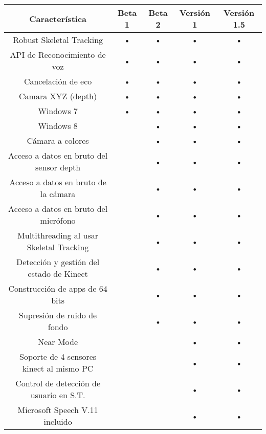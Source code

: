 \documentclass[11pt,a4paper]{article}
\begin{document}
\begin{tabular}{||c||c||c||c||c||}
\rowcolor{LightBlue2}

\hline  Característica                           & Beta 1 & Beta 2 & Versión 1 & Versión 1.5 \\ 
\hline Robust Skeletal Tracking                 & •      & •      & •         & •           \\ 
\hline API de Reconocimiento de voz             & •      & •      & •         & •           \\ 
\hline Cancelación de eco                       & •      & •      & •         & •           \\ 
\hline Camara XYZ (depth)                       & •      & •      & •         & •           \\ 
\hline Windows 7                                & •      & •      & •         & •           \\ 
\hline Windows 8                                &        & •      & •         & •           \\ 
\hline Cámara a colores                         &        & •      & •         & •           \\ 
\hline Acceso a datos en bruto del sensor depth &        & •      & •         & •           \\ 
\hline Acceso a datos en bruto de la cámara     &        & •      & •         & •           \\ 
\hline Acceso a datos en bruto del micrófono    &        & •      & •         & •           \\ 
\hline Multithreading al usar Skeletal Tracking &        & •      & •         & •           \\ 
\hline Detección y gestión del estado de Kinect &        & •      & •         & •           \\ 
\hline Construcción de apps de 64 bits          &        & •      & •         & •           \\ 
\hline Supresión de ruido de fondo              &        & •      & •         & •           \\ 
\hline Near Mode                                &        &        & •         & •           \\
\hline Soporte de 4 sensores kinect al mismo PC &        &        & •         & •           \\ 
\hline Control de detección de usuario en S.T.  &        &        & •         & •           \\ 
\hline Microsoft Speech V.11 incluido           &        &        & •         & •           \\  

\end{tabular}
\end{document}

